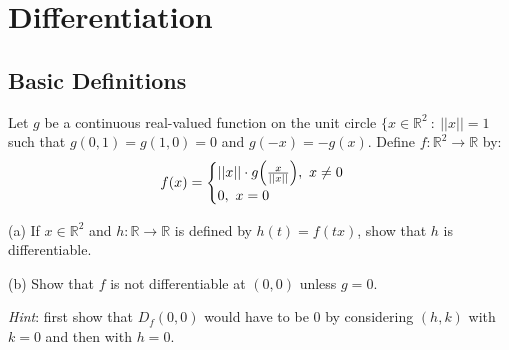 \chapter{Differentiation}


\section{Basic Definitions}

\begin{exercise}{4}
    Let $g$ be a continuous real-valued function on the unit circle $\{x \in \mathbb{R}^2\ :\ \lvert \lvert x \rvert \rvert = 1$ such that $g(0, 1) = g(1, 0) = 0$ and $g(-x) = -g(x)$. Define $f: \mathbb{R}^2 \rightarrow \mathbb{R}$ by:
    $$f(x) = \begin{cases}
        \lvert \lvert x \rvert \rvert \cdot g\Bigl(\frac{x}{\lvert \lvert x \rvert \rvert}\Bigr),\ x \neq 0 \\
        0,\ x = 0
    \end{cases}$$

    (a) If $x \in \mathbb{R}^2$ and $h: \mathbb{R} \rightarrow \mathbb{R}$ is defined by $h(t) = f(tx)$, show that $h$ is differentiable.

    (b) Show that $f$ is not differentiable at $(0, 0)$ unless $g = 0$.

    \textit{Hint}: first show that $D_f(0, 0)$ would have to be 0 by considering $(h, k) $ with $k = 0$ and then with $h = 0$.
\end{exercise}

